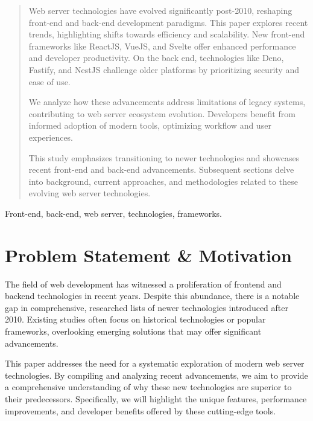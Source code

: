 \documentclass[conference]{IEEEtran}
\begin{document}
\maketitle

\begin{abstract}
Web server technologies have evolved significantly post-2010, reshaping front-end and back-end development paradigms. This paper explores recent trends, highlighting shifts towards efficiency and scalability. New front-end frameworks like ReactJS, VueJS, and Svelte offer enhanced performance and developer productivity. On the back end, technologies like Deno, Fastify, and NestJS challenge older platforms by prioritizing security and ease of use.

We analyze how these advancements address limitations of legacy systems, contributing to web server ecosystem evolution. Developers benefit from informed adoption of modern tools, optimizing workflow and user experiences.

This study emphasizes transitioning to newer technologies and showcases recent front-end and back-end advancements. Subsequent sections delve into background, current approaches, and methodologies related to these evolving web server technologies.
\end{abstract}

\begin{IEEEkeywords}
Front-end, back-end, web server, technologies, frameworks.
\end{IEEEkeywords}

\section{Problem Statement \& Motivation}

The field of web development has witnessed a proliferation of frontend and backend technologies in recent years. Despite this abundance, there is a notable gap in comprehensive, researched lists of newer technologies introduced after 2010. Existing studies often focus on historical technologies or popular frameworks, overlooking emerging solutions that may offer significant advancements.

This paper addresses the need for a systematic exploration of modern web server technologies. By compiling and analyzing recent advancements, we aim to provide a comprehensive understanding of why these new technologies are superior to their predecessors. Specifically, we will highlight the unique features, performance improvements, and developer benefits offered by these cutting-edge tools.
\end{document}
